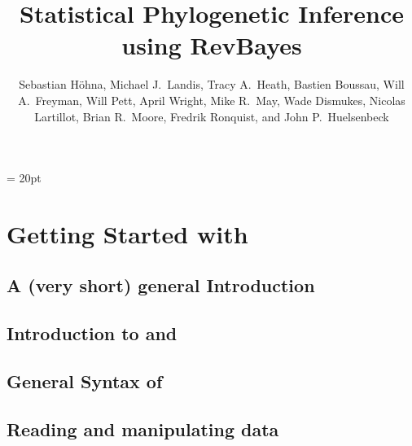 \documentclass[11pt]{book}
\begin{document}
\renewcommand{\headrulewidth}{0.5pt}
\headsep = 20pt
\lhead{ }


\frontmatter

\title{\Huge \textbf{Statistical Phylogenetic Inference using RevBayes} }
\author{
Sebastian H{\"o}hna,
Michael J.~Landis,
Tracy A.~Heath,
Bastien Boussau,
Will A.~Freyman,
Will Pett,
April Wright,
Mike R.~May,
Wade Dismukes,
Nicolas Lartillot,
Brian R.~Moore,
Fredrik Ronquist, and
John P.~Huelsenbeck
}


\maketitle

\tableofcontents




\mainmatter

\def \GlobalResourcePath {./}

\part{Getting Started with \RevBayes}

\chapter{A (very short) general Introduction}
\def \ResourcePath {RB_Getting_Started/}


\chapter{Introduction to \RevBayes and \Rev}
\def \ResourcePath {RB_Intro_Tutorial/}



\chapter{General Syntax of \Rev}
\def \ResourcePath {RB_Rev_Tutorial/}


\chapter{Reading and manipulating data}
\def \ResourcePath {RB_Data_Tutorial/}

\end{document}
